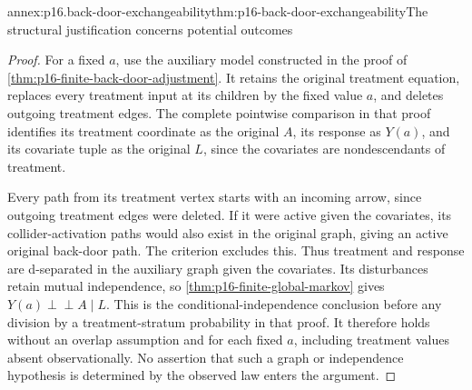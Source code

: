 \begin{annexitem}{annex:p16.back-door-exchangeability}{thm:p16-back-door-exchangeability}{The structural justification concerns potential outcomes}
\begin{proof}
For a fixed \(a\), use the auxiliary model constructed in the
proof of \cref{thm:p16-finite-back-door-adjustment}. It retains
the original treatment equation, replaces every treatment input at
its children by the fixed value \(a\), and deletes outgoing
treatment edges. The complete pointwise comparison in that proof
identifies its treatment coordinate as the original \(A\), its
response as \(Y(a)\), and its covariate tuple as the original
\(L\), since the covariates are nondescendants of treatment.

Every path from its treatment vertex starts with an incoming arrow,
since outgoing treatment edges were deleted. If it were active given
the covariates, its collider-activation paths would also exist in
the original graph, giving an active original back-door path. The
criterion excludes this. Thus treatment and response are d-separated
in the auxiliary graph given the covariates. Its disturbances retain
mutual independence, so \cref{thm:p16-finite-global-markov} gives
\(Y(a)\mathrel{\perp\!\!\!\perp}A\mid L\).
This is the conditional-independence conclusion before any division
by a treatment-stratum probability in that proof. It therefore holds
without an overlap assumption and for each fixed \(a\), including
treatment values absent observationally. No assertion that such a
graph or independence hypothesis is determined by the observed law
enters the argument.
\end{proof}
\end{annexitem}

